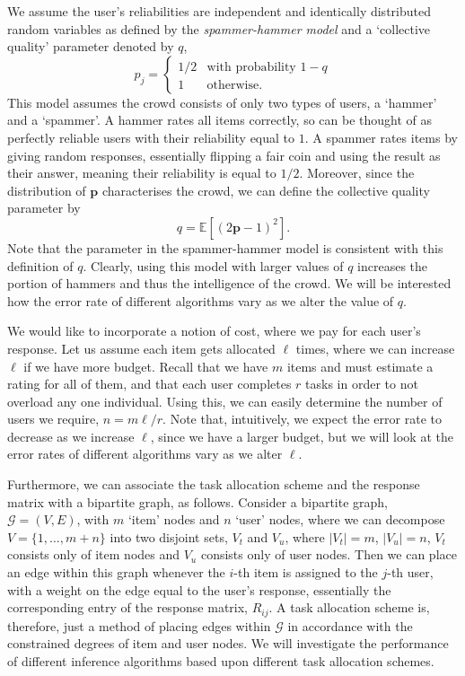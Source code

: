\documentclass[12pt]{article}
\numberwithin{equation}{section}
\newcommand*\abs[1]{\left\vert#1\right\vert}
\begin{document}
We assume the user's reliabilities are independent and identically distributed random variables as defined by the \textit{spammer-hammer model} and a `collective quality' parameter denoted by $q$,
\begin{equation}
	p_{j} =
	\begin{cases}
		1/2 & \text{with probability } 1-q\\
		1 & \text{otherwise}.
	\end{cases}
\end{equation}
This model assumes the crowd consists of only two types of users, a `hammer' and a `spammer'. A hammer rates all items correctly, so can be thought of as perfectly reliable users with their reliability equal to $1$. A spammer rates items by giving random responses, essentially flipping a fair coin and using the result as their answer, meaning their reliability is equal to $1/2$.  Moreover, since the distribution of $\mathbf{p}$ characterises the crowd, we can define the collective quality parameter by
\begin{equation}
	q = \mathbb{E}[(2\mathbf{p}-1)^{2}].
\end{equation}
Note that the parameter in the spammer-hammer model is consistent with this definition of $q$.
Clearly, using this model with larger values of $q$ increases the portion of hammers and thus the intelligence of the crowd. We will be interested how the error rate of different algorithms vary as we alter the value of $q$.

We would like to incorporate a notion of cost, where we pay for each user's response. Let us assume each item gets allocated $\ell$ times, where we can increase $\ell$ if we have more budget. Recall that we have $m$ items and must estimate a rating for all of them, and that each user completes $r$ tasks in order to not overload any one individual. Using this, we can easily determine the number of users we require, $n = m\ell/r$. Note that, intuitively, we expect the error rate to decrease as we increase $\ell$, since we have a larger budget, but we will look at the error rates of different algorithms vary as we alter $\ell$.

Furthermore, we can associate the task allocation scheme and the response matrix with a bipartite graph, as follows. Consider a bipartite graph, $\mathcal{G} = (V,E)$, with $m$ `item' nodes and $n$ `user' nodes, where we can decompose $V=\{1,\dots,m+n\}$ into two disjoint sets, $V_{t}$ and $V_{u}$, where $\abs{V_{t}} = m$, $\abs{V_{u}} = n$, $V_{t}$ consists only of item nodes and $V_{u}$ consists only of user nodes. Then we can place an edge within this graph whenever the $i$-th item is assigned to the $j$-th user, with a weight on the edge equal to the user's response, essentially the corresponding entry of the response matrix, $R_{ij}$. A task allocation scheme is, therefore, just a method of placing edges within $\mathcal{G}$ in accordance with the constrained degrees of item and user nodes. We will investigate the performance of different inference algorithms based upon different task allocation schemes.
\end{document}
